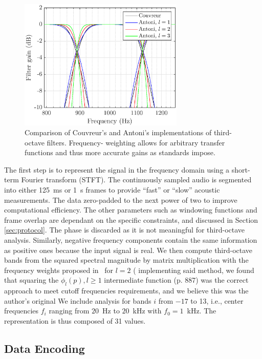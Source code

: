\documentclass[sensors,article,accept,moreauthors,pdftex,10pt,a4paper]{mdpi}
\begin{document}
\begin{figure}[H]
	\centering
		\includegraphics[width=0.7\textwidth]{figures/tob_imp.eps}
	\caption{Comparison of Couvreur's and Antoni's implementations of third-octave filters. Frequency- weighting allows for arbitrary transfer functions and thus more accurate gains {as standards impose.}}
	\label{fig:freq_filt}
\end{figure}

The first step is to represent the signal in the frequency domain using a short-term Fourier transform (STFT). The continuously sampled audio is segmented into either 125~ms or 1~s frames to provide ``fast'' or ``slow'' acoustic measurements. The data  zero-padded to the next power of two to improve computational efficiency. The other parameters such as windowing functions and frame overlap are dependant on the specific constraints, and discussed in Section \ref{sec:protocol}. The phase is discarded as it is not meaningful for third-octave analysis. Similarly, negative frequency components contain the same information as positive ones because the input signal is real. We then compute third-octave bands from the squared spectral magnitude by matrix multiplication with the frequency weights proposed in~\cite{antoni2010} for $l = 2$ ({ implementing said method, we found that squaring the $\phi_l(p), l \geq 1$ intermediate function (p. 887) was the correct approach to meet cutoff frequencies requirements, and we believe this was the author's original } We include analysis for bands $i$ from $-17$ to 13, i.e., center frequencies $f_i$ ranging from $20$~Hz to $20$~kHz with $f_0 = 1$~kHz. The representation is thus composed of 31 values.


\subsection{Data Encoding} \label{sec:dataenc}
\end{document}
